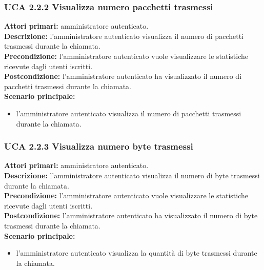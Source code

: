 \subsubsection{UCA 2.2.2 Visualizza numero pacchetti trasmessi}
\noindent 
\textbf{Attori primari:} amministratore autenticato.\\
\textbf{Descrizione:} l'amministratore autenticato visualizza il numero di pacchetti trasmessi durante la chiamata.\\
\textbf{Precondizione:} l'amministratore autenticato vuole visualizzare le statistiche ricevute dagli utenti iscritti.\\
\textbf{Postcondizione:} l'amministratore autenticato ha visualizzato il numero di pacchetti trasmessi durante la chiamata.\\
\textbf{Scenario principale:}
\begin{itemize}
\item l'amministratore autenticato visualizza il numero di pacchetti trasmessi durante la chiamata.
\end{itemize}

\subsubsection{UCA 2.2.3 Visualizza numero byte trasmessi}
\noindent 
\textbf{Attori primari:} amministratore autenticato.\\
\textbf{Descrizione:} l'amministratore autenticato visualizza il numero di byte trasmessi durante la chiamata.\\
\textbf{Precondizione:} l'amministratore autenticato vuole visualizzare le statistiche ricevute dagli utenti iscritti.\\
\textbf{Postcondizione:} l'amministratore autenticato ha visualizzato il numero di byte trasmessi durante la chiamata.\\
\textbf{Scenario principale:}
\begin{itemize}
\item l'amministratore autenticato visualizza la quantità di byte trasmessi durante la chiamata.
\end{itemize}

